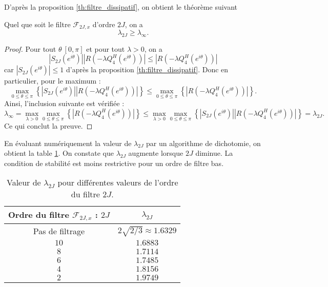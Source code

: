 D'après la proposition \ref{th:filtre_dissipatif}, on obtient le théorème suivant
\begin{theoreme}
Quel que soit le filtre $\mathcal{F}_{2J,x}$ d'ordre $2J$, on a 
\begin{equation}
\lambda_{2J} \geq \lambda_{\infty}.
\end{equation}
\end{theoreme}

\begin{proof}
Pour tout $\theta \ [0,\pi]$ et pour tout $\lambda >0$, on a 
\begin{equation}
|S_{2J}(e^{i \theta})||R(-\lambda Q_4^H(e^{i \theta}))| \leq  |R(-\lambda Q_4^H(e^{i \theta}))|
\end{equation}
car $|S_{2J}(e^{i \theta})| \leq 1$ d'après la proposition \ref{th:filtre_dissipatif}. Donc en particulier, pour le maximum :
\begin{equation}
\max_{0\leq \theta \leq \pi} \left\lbrace |S_{2J}(e^{i \theta})||R(-\lambda Q_4^H(e^{i \theta}))| \right\rbrace \leq  \max_{0\leq \theta \leq \pi} \left\lbrace|R(-\lambda Q_4^H(e^{i \theta}))|\right\rbrace.
\end{equation}
Ainsi, l'inclusion suivante est vérifiée :
\begin{equation}
\lambda_{\infty} = \max_{\lambda >0} \max_{0\leq \theta \leq \pi} \left\lbrace|R(-\lambda Q_4^H(e^{i \theta}))|\right\rbrace \leq  \max_{\lambda >0} \max_{0\leq \theta \leq \pi} \left\lbrace |S_{2J}(e^{i \theta})||R(-\lambda Q_4^H(e^{i \theta}))| \right\rbrace = \lambda_{2J}.
\end{equation}
Ce qui conclut la preuve.
\end{proof}

En évaluant numériquement la valeur de $\lambda_{2J}$ par un algorithme de dichotomie, on obtient la table \ref{tab:cfl_adv1d}. On constate que $\lambda_{2J}$ augmente lorsque $2J$ diminue. La condition de stabilité est moins restrictive pour un ordre de filtre bas.

\begin{table}[htbp]
\begin{center}
\begin{tabular}{|c|c|}
\hline
\textbf{Ordre du filtre} $\mathcal{F}_{2J,x}$ : $2J$ & $\lambda_{2J}$ \\
\hline
\hline
Pas de filtrage & $2 \sqrt{2/3} \approx 1.6329$ \\
$10$ & $1.6883$ \\
$ 8$ & $1.7114$ \\
$ 6$ & $1.7485$ \\
$ 4$ & $1.8156$ \\
$ 2$ & $1.9749$ \\
\hline
\end{tabular}
\end{center}
\caption{Valeur de $\lambda_{2J}$ pour différentes valeurs de l'ordre du filtre $2J$.}
\label{tab:cfl_adv1d}
\end{table}













